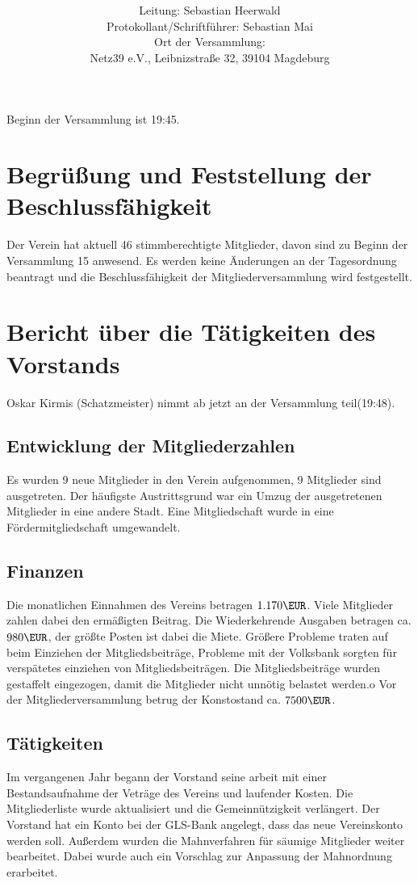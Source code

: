 \documentclass[a4paper,12pt,titlepage]{scrartcl}
\title{ \logo \\ \vspace{0.2\baselineskip} \thetitle}
\author{
Leitung: Sebastian Heerwald\\
Protokollant/Schriftführer: Sebastian Mai \\
Ort der Versammlung:\\ Netz39 e.V., Leibnizstraße 32, 39104 Magdeburg \\
}
\date{\displaydate{date}} %
\begin{document}
\maketitle
\tableofcontents

\clearpage

Beginn der Versammlung ist 19:45.

\section{Begrüßung und Feststellung der Beschlussfähigkeit}

Der Verein hat aktuell 46 stimmberechtigte Mitglieder, davon sind zu Beginn der Versammlung 15 anwesend. Es werden keine Änderungen an der Tagesordnung beantragt und die Beschlussfähigkeit der Mitgliederversammlung wird festgestellt.

\section{Bericht über die Tätigkeiten des Vorstands}
Oskar Kirmis (Schatzmeister) nimmt ab jetzt an der Versammlung teil(19:48).

\subsection{Entwicklung der Mitgliederzahlen}
Es wurden 9 neue Mitglieder in den Verein aufgenommen, 9 Mitglieder sind ausgetreten. Der häufigste Austrittsgrund war ein Umzug der ausgetretenen Mitglieder in eine andere Stadt. Eine Mitgliedschaft wurde in eine Fördermitgliedschaft umgewandelt.

\subsection{Finanzen}
Die monatlichen Einnahmen des Vereins betragen $1.170\EUR$. Viele Mitglieder zahlen dabei den ermäßigten Beitrag. Die Wiederkehrende Ausgaben betragen ca. $980\EUR$, der größte Posten ist dabei die Miete.
Größere Probleme traten auf beim Einziehen der Mitgliedsbeiträge, Probleme mit der Volksbank sorgten für verspätetes einziehen von Mitgliedsbeiträgen. Die Mitgliedsbeiträge wurden gestaffelt eingezogen, damit die Mitglieder nicht unnötig belastet werden.o
Vor der Mitgliederversammlung betrug der Konstostand ca. $7500\EUR$.

\subsection{Tätigkeiten}
Im vergangenen Jahr begann der Vorstand seine arbeit mit einer Bestandsaufnahme der Veträge des Vereins und laufender Kosten. Die Mitgliederliste wurde aktualisiert und die Gemeinnützigkeit verlängert. Der Vorstand hat ein Konto bei der GLS-Bank angelegt, dass das neue Vereinskonto werden soll. Außerdem wurden die Mahnverfahren für säumige Mitglieder weiter bearbeitet. Dabei wurde auch ein Vorschlag zur Anpassung der Mahnordnung erarbeitet.
\end{document}
